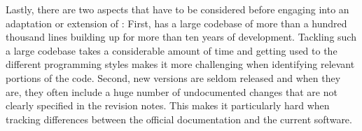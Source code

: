 Lastly, there are two aspects that have to be considered before engaging into an adaptation or extension of \spf{}: First, \spf{} has a large codebase of more than a hundred thousand lines building up for more than ten years of development. Tackling such a large codebase takes a considerable amount of time and getting used to the different programming styles makes it more challenging when identifying relevant portions of the code. Second, new versions are seldom released and when they are, they often include a huge number of undocumented changes that are not clearly specified in the revision notes. This makes it particularly hard when tracking differences between the official documentation and the current software.

